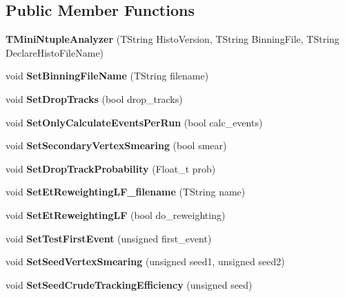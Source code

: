 \subsection*{Public Member Functions}
\begin{CompactItemize}
\item 
\textbf{TMini\-Ntuple\-Analyzer} (TString Histo\-Version, TString Binning\-File, TString Declare\-Histo\-File\-Name)\label{classTMiniNtupleAnalyzer_1ede6ceb99c7ffc81598e30dae9e321f}

\item 
void \textbf{Set\-Binning\-File\-Name} (TString filename)\label{classTMiniNtupleAnalyzer_096390422b311dbbce27c1de8827d69a}

\item 
void \textbf{Set\-Drop\-Tracks} (bool drop\_\-tracks)\label{classTMiniNtupleAnalyzer_ee46501e8f2958b4873ae723448525c6}

\item 
void \textbf{Set\-Only\-Calculate\-Events\-Per\-Run} (bool calc\_\-events)\label{classTMiniNtupleAnalyzer_ba5919ba7d3a0bfc5926a31a29833776}

\item 
void \textbf{Set\-Secondary\-Vertex\-Smearing} (bool smear)\label{classTMiniNtupleAnalyzer_e58b5e858e9177ea39f723d35ee5c8f4}

\item 
void \textbf{Set\-Drop\-Track\-Probability} (Float\_\-t prob)\label{classTMiniNtupleAnalyzer_a8302ceb976cf37bab9aa2071bb6c17e}

\item 
void \textbf{Set\-Et\-Reweighting\-LF\_\-filename} (TString name)\label{classTMiniNtupleAnalyzer_55dd3d0f87f8cf8dc7bf3b9330579d37}

\item 
void \textbf{Set\-Et\-Reweighting\-LF} (bool do\_\-reweighting)\label{classTMiniNtupleAnalyzer_d18515e2a69a3297f7d52b27c0892e96}

\item 
void \textbf{Set\-Test\-First\-Event} (unsigned first\_\-event)\label{classTMiniNtupleAnalyzer_31702ea04ef8454a7db0facef9796c8c}

\item 
void \textbf{Set\-Seed\-Vertex\-Smearing} (unsigned seed1, unsigned seed2)\label{classTMiniNtupleAnalyzer_aa1d0572de17d29a39ef04b3b2db1475}

\item 
void \textbf{Set\-Seed\-Crude\-Tracking\-Efficiency} (unsigned seed)\label{classTMiniNtupleAnalyzer_7cbfe4c310a68720faebb63512e7934a}


\end{CompactItemize}

